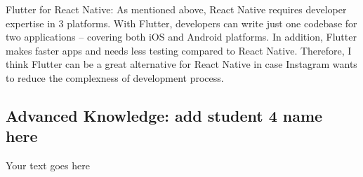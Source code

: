 \documentclass[a4paper, 11pt]{report}
\begin{document}
Flutter for React Native: As mentioned above, React Native requires developer expertise in 3 platforms. With Flutter, developers can write just one codebase for two applications – covering both iOS and Android platforms\cite{ky11}. In addition, Flutter makes faster apps and needs less testing compared to React Native. Therefore, I think Flutter can be a great alternative for React Native in case Instagram wants to reduce the complexness of development process.

\subsection{Advanced Knowledge: add student 4 name here}

Your text goes here




\newpage



\end{document}
